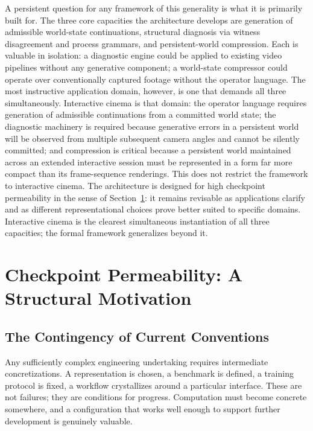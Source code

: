 \documentclass[11pt,a4paper]{article}
\theoremstyle{plain}
\theoremstyle{definition}
\theoremstyle{remark}
\begin{document}
A persistent question for any framework of this generality is what it is primarily built for. The three core capacities the architecture develops are generation of admissible world-state continuations, structural diagnosis via witness disagreement and process grammars, and persistent-world compression. Each is valuable in isolation: a diagnostic engine could be applied to existing video pipelines without any generative component; a world-state compressor could operate over conventionally captured footage without the operator language. The most instructive application domain, however, is one that demands all three simultaneously. Interactive cinema is that domain: the operator language requires generation of admissible continuations from a committed world state; the diagnostic machinery is required because generative errors in a persistent world will be observed from multiple subsequent camera angles and cannot be silently committed; and compression is critical because a persistent world maintained across an extended interactive session must be represented in a form far more compact than its frame-sequence renderings. This does not restrict the framework to interactive cinema. The architecture is designed for high checkpoint permeability in the sense of Section~\ref{sec:motivation}: it remains revisable as applications clarify and as different representational choices prove better suited to specific domains. Interactive cinema is the clearest simultaneous instantiation of all three capacities; the formal framework generalizes beyond it.


\section{Checkpoint Permeability: A Structural Motivation}
\label{sec:motivation}

\subsection{The Contingency of Current Conventions}

Any sufficiently complex engineering undertaking requires intermediate concretizations. A representation is chosen, a benchmark is defined, a training protocol is fixed, a workflow crystallizes around a particular interface. These are not failures; they are conditions for progress. Computation must become concrete somewhere, and a configuration that works well enough to support further development is genuinely valuable.
\end{document}
